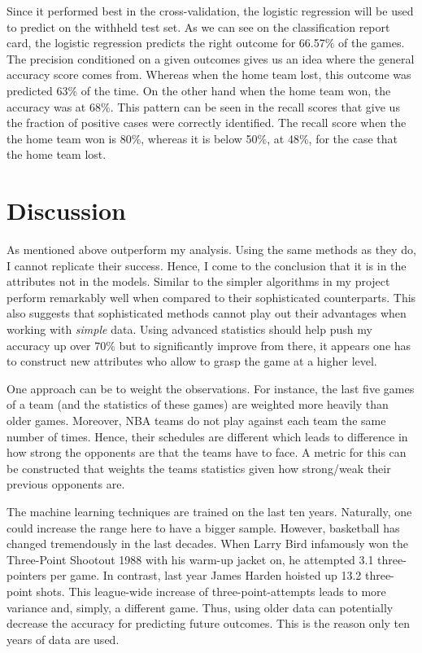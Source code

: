 \documentclass[11pt, a4paper, leqno]{article}
\begin{document}
Since it performed best in the cross-validation, the logistic regression will be used to predict on the withheld test set. As we can see on the classification report card, the logistic regression predicts the right outcome for 66.57\% of the games. The precision conditioned on a given outcomes gives us an idea where the general accuracy score comes from. Whereas when the home team lost, this outcome was predicted 63\% of the time. On the other hand when the home team won, the accuracy was at 68\%. This pattern can be seen in the recall scores that give us the fraction of positive cases were correctly identified. The recall score when the the home team won is 80\%, whereas it is below 50\%, at 48\%, for the case that the home team lost.

\section{Discussion}

As mentioned above \citet{Zimbo} outperform my analysis. Using the same methods as they do, I cannot replicate their success.  Hence, I come to the conclusion that it is in the attributes not in the models. Similar to \citet{Zimbo} the simpler algorithms in my project perform remarkably well when compared to their sophisticated counterparts. This also suggests that sophisticated methods cannot play out their advantages when working with \textit{simple} data. Using advanced statistics should help push my accuracy up over 70\% but to significantly improve from there, it appears one has to construct new attributes who allow to grasp the game at a higher level.

One approach can be to weight the observations. For instance, the last five games of a team (and the statistics of these games) are weighted more heavily than older games. Moreover, NBA teams do not play against each team the same number of times. Hence, their schedules are different which leads to difference in how strong the opponents are that the teams have to face. A metric for this can be constructed that weights the teams statistics given how strong/weak their previous opponents are.

The machine learning techniques are trained on the last ten years. Naturally, one could increase the range here to have a bigger sample. However, basketball has changed tremendously in the last decades. When Larry Bird infamously won the Three-Point Shootout 1988 with his warm-up jacket on, he attempted 3.1 three-pointers per game. In contrast, last year James Harden hoisted up 13.2 three-point shots. This league-wide increase of three-point-attempts leads to more variance and, simply, a different game. Thus, using older data can potentially decrease the accuracy for predicting future outcomes. This is the reason only ten years of data are used.
\end{document}
